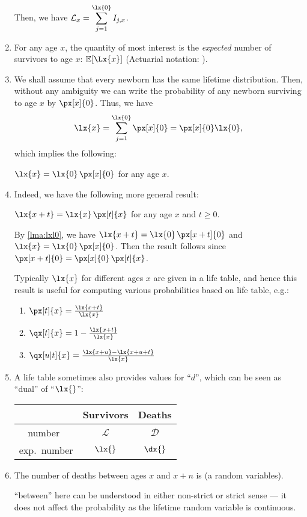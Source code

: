 \begin{enumerate}
Then, we have \(\displaystyle\mathcal{L}_{x}=\sum_{j=1}^{\lx{0}}I_{j,x}\).
\item For any age \(x\), the quantity of most interest is the \emph{expected}
number of survivors to age \(x\): \(\expv{\Lx{x}}\) (Actuarial notation:
).
\item We shall assume that every newborn has the same lifetime distribution.
Then, without any ambiguity we can write the probability of any newborn
surviving to age \(x\) by \(\px[x]{0}\). Thus, we have
\[
\lx{x}=\sum_{j=1}^{\lx{0}}\px[x]{0}=\px[x]{0}\lx{0},
\]
which implies the following:
\begin{lemma}
\label{lma:lxl0}
\(\lx{x}=\lx{0}\,\px[x]{0}\) for any age \(x\).
\end{lemma}

\item Indeed, we have the following more general result:
\begin{proposition}
\label{prp:lxpx}
\(\lx{x+t}=\lx{x}\,\px[t]{x}\) for any age \(x\) and \(t\ge 0\).
\end{proposition}
\begin{pf}
By \cref{lma:lxl0}, we have \(\lx{x+t}=\lx{0}\,\px[x+t]{0}\) and
\(\lx{x}=\lx{0}\,\px[x]{0}\). Then the result follows since
\(\px[x+t]{0}=\px[x]{0}\,\px[t]{x}\).
\end{pf}

Typically \(\lx{x}\) for different ages \(x\) are given in a life table, and
hence this result is useful for computing various probabilities based on life
table, e.g.:
\begin{enumerate}
\item \(\px[t]{x}=\frac{\lx{x+t}}{\lx{x}}\)
\item \(\qx[t]{x}=1-\frac{\lx{x+t}}{\lx{x}}\)
\item \(\qx[u|t]{x}=\frac{\lx{x+u}-\lx{x+u+t}}{\lx{x}}\)
\end{enumerate}

\item A life table sometimes also provides values for ``\(d\)'', which can be
seen as ``dual'' of ``\(\lx{}\)'':
\begin{center}
\begin{tabular}{ccc}
\toprule
&Survivors&Deaths\\
\midrule
number\ &\(\mathcal{L}\)&\(\mathcal{D}\)\\
exp.\ number &\(\lx{}\)&\(\dx{}\)\\
\bottomrule
\end{tabular}
\end{center}
\item The number of deaths between ages \(x\) and \(x+n\) is
 (a random variables).
\begin{note}
``between'' here can be understood in either non-strict or strict sense --- it
does not affect the probability as the lifetime random variable is continuous.
\end{note}


\end{enumerate}
